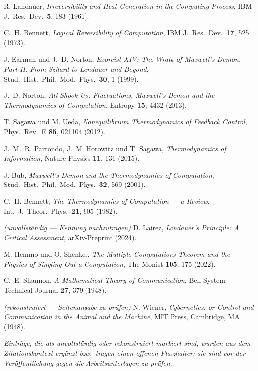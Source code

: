 \begingroup
\small
\begin{description}[leftmargin=3.2em,style=sameline,itemsep=0.3em]

\item[{[B1]}] R. Landauer, \emph{Irreversibility and Heat Generation in the
Computing Process}, IBM J.\ Res.\ Dev.\ \textbf{5}, 183 (1961).

\item[{[B2]}] C.~H. Bennett, \emph{Logical Reversibility of Computation}, IBM J.\
Res.\ Dev.\ \textbf{17}, 525 (1973).

\item[{[B3]}] J. Earman und J.~D. Norton, \emph{Exorcist XIV: The Wrath of
Maxwell's Demon. Part II: From Szilard to Landauer and Beyond}, Stud.\ Hist.\
Phil.\ Mod.\ Phys.\ \textbf{30}, 1 (1999).

\item[{[B4]}] J.~D. Norton, \emph{All Shook Up: Fluctuations, Maxwell's Demon and
the Thermodynamics of Computation}, Entropy \textbf{15}, 4432 (2013).

\item[{[B5]}] T. Sagawa und M. Ueda, \emph{Nonequilibrium Thermodynamics of
Feedback Control}, Phys.\ Rev.\ E \textbf{85}, 021104 (2012).

\item[{[B6]}] J.~M.~R. Parrondo, J.~M. Horowitz und T. Sagawa,
\emph{Thermodynamics of Information}, Nature Physics \textbf{11}, 131 (2015).

\item[{[B7]}] J. Bub, \emph{Maxwell's Demon and the Thermodynamics of
Computation}, Stud.\ Hist.\ Phil.\ Mod.\ Phys.\ \textbf{32}, 569 (2001).

\item[{[B8]}] C.~H. Bennett, \emph{The Thermodynamics of Computation --- a
Review}, Int.\ J.\ Theor.\ Phys.\ \textbf{21}, 905 (1982).

\item[{[B9]}] \emph{(unvollständig --- Kennung nachzutragen)} D. Lairez,
\emph{Landauer's Principle: A Critical Assessment}, arXiv-Preprint (2024).

\item[{[B10]}] M. Hemmo und O. Shenker, \emph{The Multiple-Computations Theorem
and the Physics of Singling Out a Computation}, The Monist \textbf{105}, 175
(2022).

\item[{[B11]}] C.~E. Shannon, \emph{A Mathematical Theory of Communication}, Bell
System Technical Journal \textbf{27}, 379 (1948).

\item[{[B12]}] \emph{(rekonstruiert --- Seitenangabe zu prüfen)} N. Wiener,
\emph{Cybernetics: or Control and Communication in the Animal and the Machine},
MIT Press, Cambridge, MA (1948).

\end{description}
\endgroup

\vspace{1em}
\noindent
{\small\itshape Einträge, die als \emph{unvollständig} oder \emph{rekonstruiert}
markiert sind, wurden aus dem Zitationskontext ergänzt bzw.\ tragen einen
offenen Platzhalter; sie sind vor der Veröffentlichung gegen die
Arbeitsunterlagen zu prüfen.}
